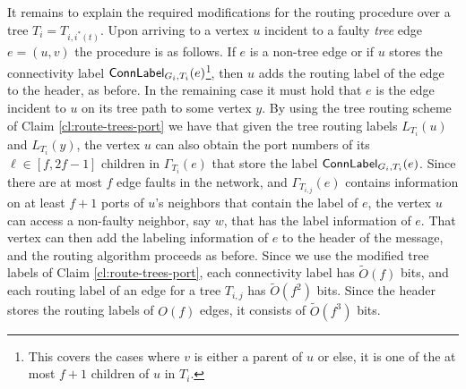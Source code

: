 It remains to explain the required modifications for the routing procedure over a tree $T_i=T_{i,i^*(t)}$. Upon arriving to a vertex $u$ incident to a faulty \emph{tree} edge $e=(u,v)$ the procedure is as follows. If $e$ is a non-tree edge or if $u$ stores the connectivity label $\mathsf{ConnLabel}_{G_i,T_i}(e)$\footnote{This covers the cases where $v$ is either a parent of $u$ or else, it is one of the at most $f+1$ children of $u$ in $T_i$.}, then $u$ adds the routing label of the edge to the header, as before. In the remaining case it must hold that $e$ is the edge incident to $u$ on its tree path to some vertex $y$. By using the tree routing scheme of Claim \ref{cl:route-trees-port} we have that given the tree routing labels  $L_{T_{i}}(u)$ and $L_{T_{i}}(y)$, the vertex $u$ can also obtain the port numbers of its $\ell \in [f,2f-1]$ children in $\Gamma_{T_{i}}(e)$ that store the label $\mathsf{ConnLabel}_{G_i,T_i}(e)$. Since there are at most $f$ edge faults in the network, and $\Gamma_{T_{i,j}}(e)$ contains information on at least $f+1$ ports of $u$'s neighbors that contain the label of $e$, the vertex $u$ can access a non-faulty neighbor, say $w$, that has the label information of $e$. That vertex can then add the labeling information of $e$ to the header of the message, and the routing algorithm proceeds as before. Since we use the modified tree labels of Claim \ref{cl:route-trees-port}, each connectivity label has $\widetilde{O}(f)$ bits, and each routing label of an edge for a tree $T_{i,j}$ has $\widetilde{O}(f^2)$ bits. Since the header stores the routing labels of $O(f)$ edges, it consists of $\widetilde{O}(f^3)$ bits. 



